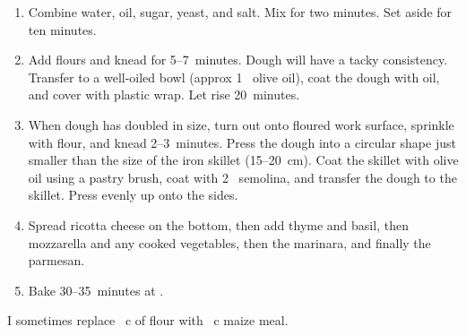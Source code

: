 
\begin{ingredients}


\end{ingredients}


\begin{recipe}
  \begin{enumerate}

  \item Combine water, oil, sugar, yeast, and salt.  Mix for two
    minutes.  Set aside for ten minutes.

  \item Add flours and knead for 5--7~minutes.  Dough will have a
    tacky consistency.  Transfer to a well-oiled bowl (approx 1~\tbsp{}
    olive oil), coat the dough with oil, and cover with plastic wrap.
    Let rise 20~minutes.

  \item When dough has doubled in size, turn out onto floured work
    surface, sprinkle with flour, and knead 2--3~minutes.  Press the
    dough into a circular shape just smaller than the size of the iron
    skillet (15--20~cm).  Coat the skillet with olive oil using a
    pastry brush, coat with 2~\tbsp{} semolina, and transfer the dough
    to the skillet.  Press evenly up onto the sides.

  \item Spread ricotta cheese on the bottom, then add thyme and basil,
    then mozzarella and any cooked vegetables, then the marinara, and
    finally the parmesan.

  \item Bake 30--35~minutes at .

  \end{enumerate}
\end{recipe}

I sometimes replace \fracH~c of flour with \fracQQ~c maize meal.


